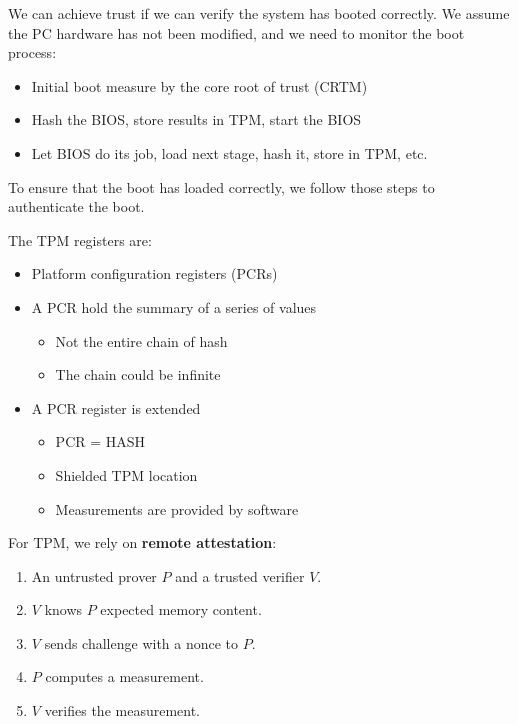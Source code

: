 \documentclass[11pt,a4paper,titlepage,dvipsnames,cmyk]{scrartcl}
\begin{document}
We can achieve trust if we can verify the system has booted correctly. We assume the PC hardware has not been modified, and we need to monitor the boot process:
\begin{itemize}
    \item Initial boot measure by the core root of trust (CRTM)
    \item Hash the BIOS, store results in TPM, start the BIOS
    \item Let BIOS do its job, load next stage, hash it, store in TPM, etc.
\end{itemize}

To ensure that the boot has loaded correctly, we follow those steps to authenticate the boot.

The TPM registers are:
\begin{itemize}
    \item Platform configuration registers (PCRs)
    \item A PCR hold the summary of a series of values
    \begin{itemize}
        \item Not the entire chain of hash
        \item The chain could be infinite
    \end{itemize}
    \item A PCR register is extended
    \begin{itemize}
        \item PCR = HASH
        \item Shielded TPM location
        \item Measurements are provided by software
    \end{itemize}
\end{itemize}

For TPM, we rely on \textbf{remote attestation}:
\begin{enumerate}
\item An untrusted prover $P$ and a trusted verifier $V$.
\item $V$ knows $P$ expected memory content.
\item $V$ sends challenge with a nonce to $P$.
\item $P$ computes a measurement.
\item $V$ verifies the measurement.
\end{enumerate}
\end{document}
